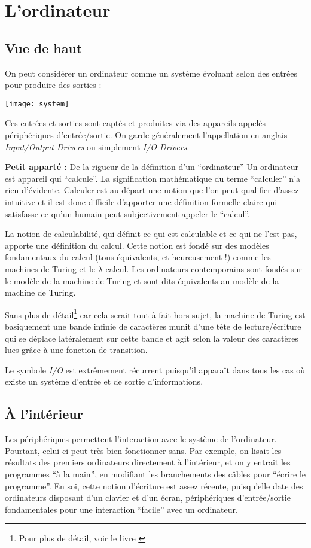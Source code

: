 \documentclass[../../main.tex]{subfiles}
\begin{document}
\section{L'ordinateur}
\label{sec:l_ordinateur}
\subsection{Vue de haut} \label{sub:vue_de_haut}
On peut considérer un ordinateur comme un système évoluant selon des entrées pour produire des sorties :
\begin{center}
  \texttt{[image: system]}
\end{center}
Ces entrées et sorties sont captés et produites via des appareils appelés périphériques d'entrée/sortie. On garde généralement l'appellation en anglais \textit{\underline{I}nput/\underline{O}utput Drivers} ou simplement \textit{\underline{I}/\underline{O} Drivers}.

\begin{minitelbasicbox}{\textbf{Petit apparté :} De la rigueur de la définition d'un ``ordinateur''}
Un ordinateur est appareil qui ``calcule''. La signification mathématique du terme ``calculer'' n'a
rien d'évidente. Calculer est au départ une notion que l'on peut qualifier d'assez intuitive et il
est donc difficile d'apporter une définition formelle claire qui satisfasse ce qu'un humain peut
subjectivement appeler le ``calcul''.

La notion de calculabilité, qui définit ce qui est calculable et ce qui ne l'est pas, apporte une
définition du calcul. Cette notion est fondé sur des modèles fondamentaux du calcul (tous
équivalents, et heureusement !) comme les machines de Turing et le $\lambda$-calcul. Les ordinateurs
contemporains sont fondés sur le modèle de la machine de Turing et sont dits équivalents au
modèle de la machine de Turing.

Sans plus de détail\footnote{Pour plus de détail, voir le livre \cite{XFI}} car cela serait tout à fait hors-sujet, la machine de Turing est basiquement une bande infinie de caractères munit d'une tête de lecture/écriture qui se déplace latéralement
sur cette bande et agit selon la valeur des caractères lues grâce à une fonction de transition.
\end{minitelbasicbox}
Le symbole \textit{I/O} est extrêmement récurrent puisqu'il apparaît dans tous les cas où existe un système d'entrée et de sortie d'informations.
\subsection{À l'intérieur}
\label{sub:_l_int_rieur}
Les périphériques permettent l'interaction avec le système de l'ordinateur. Pourtant, celui-ci peut très bien fonctionner sans. Par exemple, on lisait les résultats des premiers ordinateurs directement à l'intérieur, et on y entrait les programmes ``à la main'', en modifiant les branchements des câbles pour ``écrire le programme''. En soi, cette notion d'écriture est assez récente, puisqu'elle date des ordinateurs disposant d'un clavier et d'un écran, périphériques d'entrée/sortie fondamentales pour une interaction ``facile'' avec un ordinateur.
\end{document}
